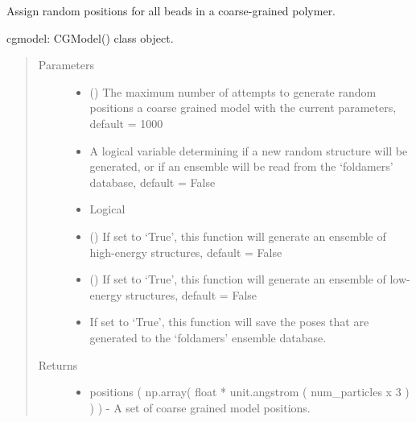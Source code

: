 \documentclass[letterpaper,12pt,english,openany,oneside]{sphinxmanual}
\begin{document}
\begin{fulllineitems}
\label{\detokenize{utilities:utilities.util.random_positions}}
Assign random positions for all beads in a coarse-grained polymer.

cgmodel: CGModel() class object.
\begin{quote}\begin{description}
\item[{Parameters}] \leavevmode\begin{itemize}
\item {} 
 () \textendash{} The maximum number of attempts to generate random positions a coarse grained model with the current parameters, default = 1000

\item {} 
 \textendash{} A logical variable determining if a new random structure will be generated, or if an ensemble will be read from the ‘foldamers’ database, default = False

\item {} 
 \textendash{} Logical

\item {} 
 () \textendash{} If set to ‘True’, this function will generate an ensemble of high-energy structures, default = False

\item {} 
 () \textendash{} If set to ‘True’, this function will generate an ensemble of low-energy structures, default = False

\item {} 
 \textendash{} If set to ‘True’, this function will save the poses that are generated to the ‘foldamers’ ensemble database.

\end{itemize}

\item[{Returns}] \leavevmode
\begin{itemize}
\item {} 
positions ( np.array( float * unit.angstrom ( num\_particles x 3 ) ) ) - A set of coarse grained model positions.

\end{itemize}


\end{description}\end{quote}

\end{fulllineitems}
\end{document}

